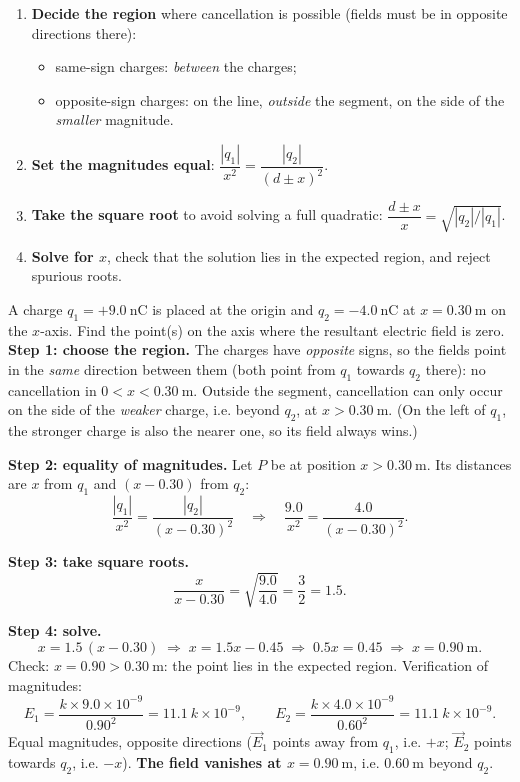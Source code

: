 \documentclass[11pt]{article}
\newcounter{popsec}
\newcounter{popsub}
\newcommand{\courssub}[1]{%
  \stepcounter{popsub}%
  \par\vspace{9pt}\noindent{\popxbold\fontsize{11.5}{13}\selectfont\color{popink}{\color{poporange}\thepopsec.\thepopsub}\hspace{6pt}#1}\par\nopagebreak\vspace{4pt}
}
\begin{document}
\courssub{Locating a Point of Zero Field}

\begin{methode}
\begin{enumerate}
\item \textbf{Decide the region} where cancellation is possible (fields must be in opposite directions there):
\begin{itemize}
\item same-sign charges: \emph{between} the charges;
\item opposite-sign charges: on the line, \emph{outside} the segment, on the side of the \emph{smaller} magnitude.
\end{itemize}
\item \textbf{Set the magnitudes equal}: $\dfrac{|q_1|}{x^2} = \dfrac{|q_2|}{(d \pm x)^2}$.
\item \textbf{Take the square root} to avoid solving a full quadratic: $\dfrac{d \pm x}{x} = \sqrt{|q_2|/|q_1|}$.
\item \textbf{Solve for $x$}, check that the solution lies in the expected region, and reject spurious roots.
\end{enumerate}
\end{methode}

\begin{exoresolu}
A charge $q_1 = +9.0\ \mathrm{nC}$ is placed at the origin and $q_2 = -4.0\ \mathrm{nC}$ at $x = 0.30\ \mathrm{m}$ on the $x$-axis. Find the point(s) on the axis where the resultant electric field is zero.
\tcblower
\textbf{Step 1: choose the region.} The charges have \emph{opposite} signs, so the fields point in the \emph{same} direction between them (both point from $q_1$ towards $q_2$ there): no cancellation in $0 < x < 0.30\ \mathrm{m}$. Outside the segment, cancellation can only occur on the side of the \emph{weaker} charge, i.e. beyond $q_2$, at $x > 0.30\ \mathrm{m}$. (On the left of $q_1$, the stronger charge is also the nearer one, so its field always wins.)

\textbf{Step 2: equality of magnitudes.} Let $P$ be at position $x > 0.30\ \mathrm{m}$. Its distances are $x$ from $q_1$ and $(x - 0.30)$ from $q_2$:
\[ \frac{|q_1|}{x^2} = \frac{|q_2|}{(x-0.30)^2} \quad\Longrightarrow\quad \frac{9.0}{x^2} = \frac{4.0}{(x-0.30)^2}. \]

\textbf{Step 3: take square roots.}
\[ \frac{x}{x - 0.30} = \sqrt{\frac{9.0}{4.0}} = \frac{3}{2} = 1.5. \]

\textbf{Step 4: solve.}
\[ x = 1.5\,(x - 0.30) \;\Longrightarrow\; x = 1.5x - 0.45 \;\Longrightarrow\; 0.5x = 0.45 \;\Longrightarrow\; x = 0.90\ \mathrm{m}. \]
Check: $x = 0.90 > 0.30\ \mathrm{m}$: the point lies in the expected region. Verification of magnitudes:
\[ E_1 = \frac{k\times 9.0\times 10^{-9}}{0.90^2} = 11.1\ k\times 10^{-9}, \qquad E_2 = \frac{k\times 4.0\times 10^{-9}}{0.60^2} = 11.1\ k\times 10^{-9}. \]
Equal magnitudes, opposite directions ($\vec E_1$ points away from $q_1$, i.e. $+x$; $\vec E_2$ points towards $q_2$, i.e. $-x$). \textbf{The field vanishes at $x = 0.90\ \mathrm{m}$}, i.e. $0.60\ \mathrm{m}$ beyond $q_2$.
\end{exoresolu}
\end{document}
